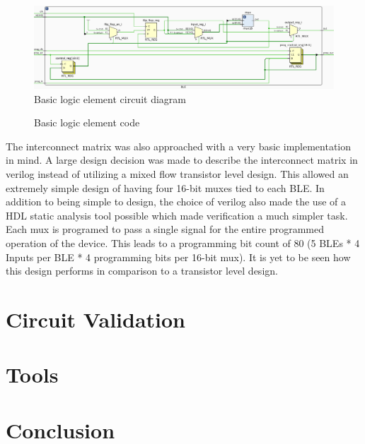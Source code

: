 \documentclass[12pt]{article}
\begin{document}
\begin{figure}[h]
    \centering
    \includegraphics[width=\textwidth]{circuit_ble}
    \caption{Basic logic element circuit diagram}
    \label{fig:ble}
\end{figure}

\begin{figure}[h]
    
    \caption{Basic logic element code}
    \label{code:ble}
\end{figure}

The interconnect matrix was also approached with a very basic implementation in mind. 
A large design decision was made to describe the interconnect matrix in verilog 
instead of utilizing a mixed flow transistor level design. This allowed an extremely 
simple design of having four 16-bit muxes tied to each BLE. In addition to being 
simple to design, the choice of verilog also made the use of a HDL static analysis 
tool possible which made verification a much simpler task. Each mux is programed 
to pass a single signal for the entire programmed operation of the device. This leads 
to a programming bit count of 80 (5 BLEs * 4 Inputs per BLE * 4 programming bits 
per 16-bit mux). It is yet to be seen how this design performs in comparison to a 
transistor level design.


\section{Circuit Validation}

\section{Tools}

\section{Conclusion}

{}

\end{document}
